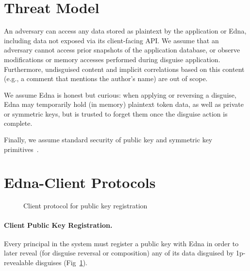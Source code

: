 \section{Threat Model}
An adversary can access any data stored as plaintext by the application or Edna, including data not exposed via its
client-facing API. We assume that an adversary cannot access prior snapshots of the application database, or observe modifications or memory accesses performed during disguise application. Furthermore, undisguised content and implicit correlations based on this content (e.g., a comment that mentions the author’s name) are out of scope.

We assume Edna is honest but curious: when applying or reversing a disguise, Edna may temporarily
hold (in memory) plaintext token data, as well as private or symmetric keys, but is trusted to
forget them once the disguise action is complete.  

Finally, we assume standard security of public key and
symmetric key primitives~.

\section{Edna-Client Protocols}

\begin{figure}[h!]
\caption{Client protocol for public key registration}
\label{fig:acctreg}
\end{figure}

\paragraph{Client Public Key Registration.}
Every principal in the system must register a public key with Edna in order to later reveal (for disguise reversal or
composition) any of its data disguised by 1p-revealable disguises (Fig~\ref{fig:acctreg}).

